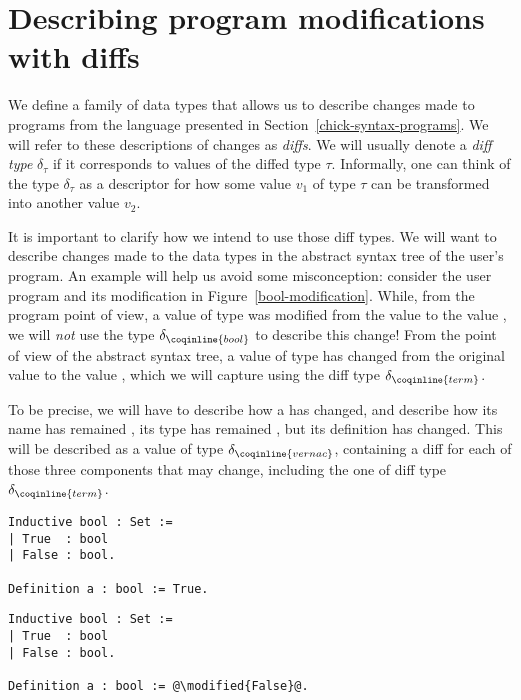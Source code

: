 \section{Describing program modifications with diffs}\label{chick-diffs}

We define a family of data types that allows us to describe changes made to
programs from the language presented in Section~\ref{chick-syntax-programs}.  We
will refer to these descriptions of changes as \textit{diffs}.  We will usually
denote a \textit{diff type} $\delta_{\tau}$ if it corresponds to values of the
diffed type $\tau$.  Informally, one can think of the type $\delta_{\tau}$ as a
descriptor for how some value $v_{1}$ of type $\tau$ can be transformed into
another value $v_{2}$.

It is important to clarify how we intend to use those diff types.  We will want
to describe changes made to the data types in the abstract syntax tree of the
user's program.  An example will help us avoid some misconception: consider the
user program and its modification in Figure~\ref{bool-modification}.  While,
from the program point of view, a value of type  was modified
from the value  to the value , we will
\emph{not} use the type $\delta_{\coqinline{bool}}$ to describe this change!
From the point of view of the abstract syntax tree, a value of type
 has changed from the original value  to
the value , which we will capture using the diff type
$\delta_{\coqinline{term}}$.

To be precise, we will have to describe how a  has
changed, and describe how its name has remained , its type has
remained , but its definition has changed.  This will be
described as a value of type $\delta_{\coqinline{vernac}}$, containing a diff
for each of those three components that may change, including the one of diff
type $\delta_{\coqinline{term}}$.

\begin{figure*}[!htp]

  \noindent%
  \begin{minipage}[t]{0.50\textwidth}
    \begin{verbatim}
Inductive bool : Set :=
| True  : bool
| False : bool.

Definition a : bool := True.
\end{verbatim}
\end{minipage}%
\begin{minipage}[t]{0.50\textwidth}
  \begin{verbatim}
Inductive bool : Set :=
| True  : bool
| False : bool.

Definition a : bool := @\modified{False}@.
\end{verbatim}
\end{minipage}

\caption{A simple program and its modification}

\label{bool-modification}

\end{figure*}

